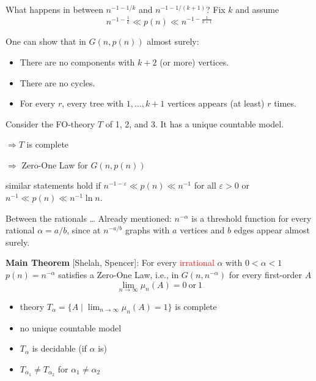 \documentclass[handout]{beamer}
\renewcommand{\emph}[1]{\textcolor{red}{#1}}
\begin{document}
\begin{frame}{What happens in between $n^{-1-1/k}$ and $n^{-1-1/(k+1)}$?}
	Fix $k$ and assume
	$$n^{-1-\frac{1}{k}} \ll p(n) \ll n^{-1-\frac{1}{k+1}}$$

	One can show that in $G(n,p(n))$ almost surely: 
	\begin{itemize}
		\item There are no components with $k+2$ (or more) vertices.
		\item There are no cycles.
		\item For every $r$, every tree with  $1,\ldots,k+1$ vertices appears (at least) $r$ times.
	\end{itemize}

	\pause
	Consider the FO-theory $T$ of 1, 2, and 3. It has a unique countable model.

	$\Rightarrow T$ is complete 

	$\Rightarrow$ Zero-One Law for $G(n,p(n))$ 

	\bigskip
	\pause
	similar statements hold if $n^{-1-\varepsilon}\ll p(n) \ll n^{-1}$ for all $\varepsilon>0$
	or $n^{-1}\ll p(n) \ll n^{-1}\ln n$. 
\end{frame}

\begin{frame}{Between the rationals \dots}
	Already mentioned: $n^{-\alpha}$ is a threshold function for every rational $\alpha=a/b$,
	since at $n^{-a/b}$ graphs with $a$ vertices and $b$ edges appear almost surely.
	
	\pause
	\bigskip
	\textbf{Main Theorem} [Shelah, Spencer]: For every \emph{irrational} $\alpha$ with $0<\alpha<1$
	$p(n)=n^{-\alpha}$ satisfies a Zero-One Law, \mbox{i.e.}, in $G(n,n^{-\alpha})$ for every first-order $A$
	$$\lim_{n\rightarrow\infty}\mu_n(A)=0\mathrm{\ or\ } 1$$

	\pause
	\begin{itemize}
		\item theory $T_{\alpha}=\{A\mid \lim_{n\rightarrow\infty}\mu_n(A)=1\}$ is complete
		\item no unique countable model
		\item $T_{\alpha}$ is decidable (if $\alpha$ is)
		\item $T_{\alpha_1}\neq T_{\alpha_2}$ for $\alpha_1\neq\alpha_2$
	\end{itemize}
\end{frame}
\end{document}
